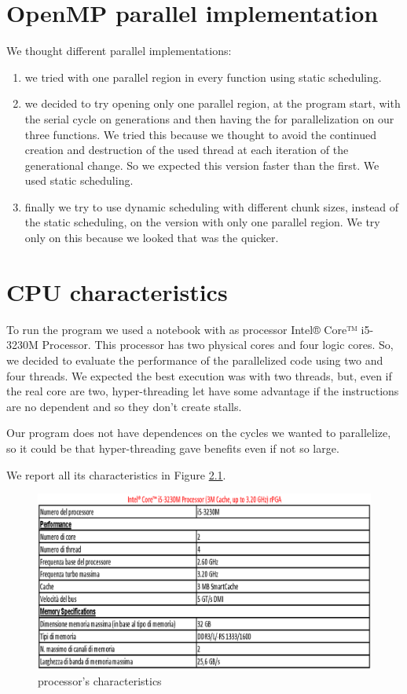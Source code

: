 \documentclass[a4paper,11pt,twoside]{report}
\begin{document}
\chapter{OpenMP parallel implementation}
We thought different parallel implementations:
\begin{enumerate}
\item we tried with one parallel region in every function using static scheduling.
	\item we decided to try opening only one parallel region, at the program start, with the serial cycle on generations and then having the for parallelization on our three functions. We tried this because we thought to avoid the continued creation and destruction of the used thread at each iteration of the generational change. So we expected this version faster than the first. We used static scheduling.
	\item finally we try to use dynamic scheduling with different chunk sizes, instead of the static scheduling, on the version with only one parallel region. We try only on this because we looked that was the quicker.
\end{enumerate}



\chapter{CPU characteristics}
To run the program we used a notebook with as processor Intel® Core™ i5-3230M Processor.
This processor has two physical cores and four logic cores. So, we decided to evaluate the performance of the parallelized code using two and four threads. We expected the best execution was with two threads, but, even if the real core are two, hyper-threading let have some advantage if the instructions are no dependent and so they don't create stalls.

\noindent Our program does not have dependences on the cycles we wanted to parallelize, so it could be that hyper-threading gave benefits even if not so large.

\noindent We report all its characteristics in Figure \ref{fig:2}.

\begin{figure}
	\centering
	\includegraphics[scale = 0.5]{i5.eps}
	\caption{processor's characteristics} \label{fig:2}
\end{figure}
\end{document}
